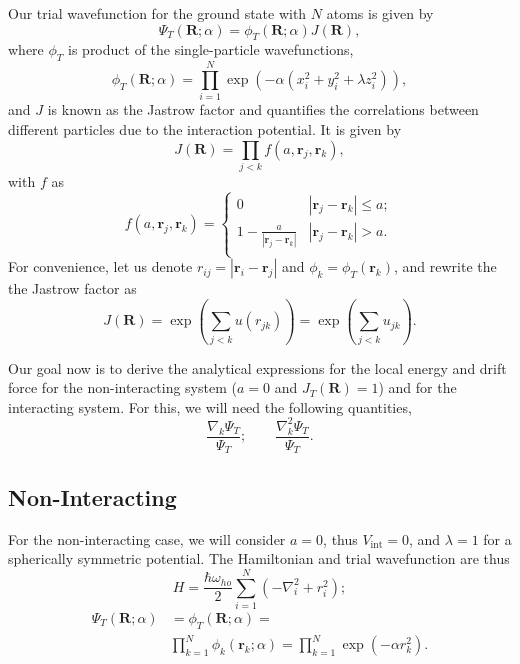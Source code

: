 \documentclass[aps,reprint,superscriptaddress,nofootinbib]{revtex4-2}
\begin{document}
    Our trial wavefunction for the ground state with \(N\) atoms is given by
    \begin{equation*}
        \Psi_T(\bm R; \alpha) = \phi_T(\bm R; \alpha) J(\bm R),
    \end{equation*}
    where \(\phi_T\) is product of the single-particle wavefunctions,
    \begin{equation*}
        \phi_T(\bm R; \alpha) = \prod_{i=1}^N \exp (- \alpha (x_i^2 + y_i^2 + \lambda z_i^2)),
    \end{equation*}
    and \(J\) is known as the Jastrow factor and quantifies the correlations between different particles due to the interaction potential. It is given by
    \begin{equation*}
        J(\bm R) = \prod_{j < k} f(a, \bm r_j, \bm r_k),
    \end{equation*}
    with \(f\) as 
    \begin{equation*}
        f(a, \bm r_j, \bm r_k) = 
        \left\{
        \begin{array}{ll}
            0 & |\bm r_j - \bm r_k| \leq a; \\
            1 - \frac{a}{|\bm r_j - \bm r_k|}  & |\bm r_j - \bm r_k| > a. \\
        \end{array} 
        \right.
    \end{equation*}
    For convenience, let us denote \(r_{ij} = |\bm r_i - \bm r_j|\) and \(\phi_k = \phi_T(\bm r_k)\), and rewrite the the Jastrow factor as 
    \begin{equation*}
        J(\bm R) = \exp \left( \sum_{j < k} u(r_{jk}) \right) = \exp \left( \sum_{j < k} u_{jk} \right).
    \end{equation*}

    Our goal now is to derive the analytical expressions for the local energy and drift force for the non-interacting system (\(a = 0\) and \(J_T(\bm R) = 1\)) and for the interacting system. For this, we will need the following quantities,
    \begin{equation*}
        \frac{\nabla_k \Psi_T}{\Psi_T}; \quad \quad \frac{\nabla^2_k \Psi_T}{\Psi_T}.
    \end{equation*}

\subsection*{Non-Interacting}

    For the non-interacting case, we will consider \(a=0\), thus \(V_{\text{int}} = 0\), and \(\lambda = 1\) for a spherically symmetric potential. The Hamiltonian and trial wavefunction are thus
    \begin{equation*}
        H = \frac{\hbar \omega_{ho}}{2} \sum_{i=1}^N \left( - \nabla_i^2 + r_i^2  \right); 
    \end{equation*}
    \begin{align*}
        \Psi_T(\bm R; \alpha) &= \phi_T(\bm R; \alpha) = \\
        &\prod_{k=1}^N \phi_k(\bm r_k; \alpha) =  \prod_{k=1}^N \exp (- \alpha r_k^2).
    \end{align*}
    
\end{document}
